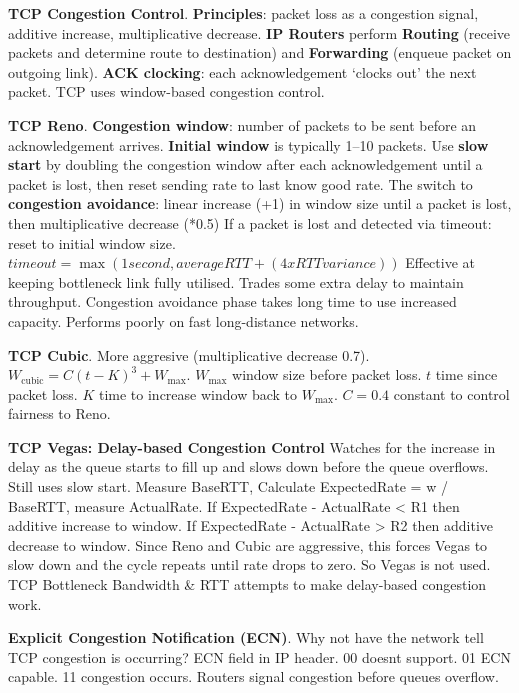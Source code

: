 \documentclass{article}
\begin{document}
\textbf{TCP Congestion Control}.
\textbf{Principles}: packet loss as a congestion signal, additive increase, multiplicative decrease.
\textbf{IP Routers} perform \textbf{Routing} (receive packets and determine route to destination) and
\textbf{Forwarding} (enqueue packet on outgoing link).
\textbf{ACK clocking}: each acknowledgement `clocks out' the next packet.
TCP uses window-based congestion control.

\vspace{\baselineskip}
\textbf{TCP Reno}.
\textbf{Congestion window}: number of packets to be sent before an acknowledgement arrives.
\textbf{Initial window} is typically 1--10 packets.
Use \textbf{slow start} by doubling the congestion window after each acknowledgement until a packet is lost,
then reset sending rate to last know good rate.
The switch to \textbf{congestion avoidance}: linear increase (+1) in window size until a packet is lost, then multiplicative decrease (*0.5)
If a packet is lost and detected via timeout: reset to initial window size.
$timeout = \max(1 second, average RTT + (4 x RTT variance))$
Effective at keeping bottleneck link fully utilised.
Trades some extra delay to maintain throughput.
Congestion avoidance phase takes long time to use increased capacity.
Performs poorly on fast long-distance networks.

\vspace{\baselineskip}
\textbf{TCP Cubic}.
More aggresive (multiplicative decrease 0.7).
$W_{\text{cubic}} = C {(t - K)}^3 + W_{\text{max}}$.
$W_{\text{max}}$ window size before packet loss.
$t$ time since packet loss.
$K$ time to increase window back to $W_{\text{max}}$.
$C = 0.4$ constant to control fairness to Reno.

\vspace{\baselineskip}
\textbf{TCP Vegas: Delay-based Congestion Control}
Watches for the increase in delay as the queue starts to fill up and slows down before the queue overflows.
Still uses slow start.
Measure BaseRTT, Calculate ExpectedRate = w / BaseRTT, measure ActualRate.
If ExpectedRate {-} ActualRate < R1 then additive increase to window.
If ExpectedRate {-} ActualRate > R2 then additive decrease to window.
Since Reno and Cubic are aggressive, this forces Vegas to slow down and the cycle repeats until rate drops to zero.
So Vegas is not used. TCP Bottleneck Bandwidth \& RTT attempts to make delay-based congestion work.

\vspace{\baselineskip}
\textbf{Explicit Congestion Notification (ECN)}.
Why not have the network tell TCP congestion is occurring? ECN field in IP header.
00 doesnt support.
01 ECN capable.
11 congestion occurs.
Routers signal congestion before queues overflow.
\end{document}
